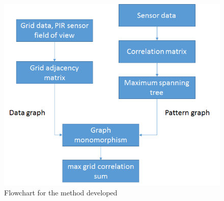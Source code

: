 \begin{figure}
\includegraphics[scale=0.6]{./pics/methodSummary.png}
\caption{Flowchart for the method developed}
\label{fig:Summary}
\centering
\end{figure}



 






 


